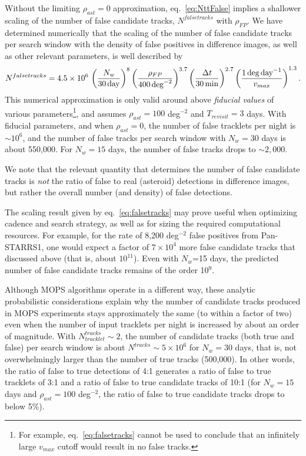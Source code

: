 Without the limiting $\rho_{ast}=0$  approximation, eq.~\ref{eq:NttFalse} implies a shallower scaling
of the number of false candidate tracks, $N^{falsetracks}$ with $\rho_{FP}$.
We have determined numerically that the scaling of the number
of false candidate tracks per search window with the density of false positives in difference
images, as well as other relevant parameters, is well described by
\begin{equation}
\label{eq:falsetracks}
   N^{falsetracks} = 4.5 \times 10^6 \, \left( {N_w \over 30 \, {\rm day} } \right)^{8} \left( {\rho_{FP} \over 400 \, {\rm deg}^{-2} }\right)^{3.7}
    \left( {\Delta t  \over 30 \, {\rm min}} \right)^{2.7}
     \left( { 1 \, {\rm deg} \, {\rm day}^{-1} \over v_{max} }  \right)^{1.3}.
\end{equation}
This numerical approximation is only valid around above {\it fiducial values} of various 
parameters\footnote{For example, eq.~\ref{eq:falsetracks} cannot be used to conclude that
an infinitely large $v_{max}$ cutoff would result in no false tracks.}, 
and assumes $\rho_{ast}=100$ deg$^{-2}$ and $T_{revisit}=3$ days. With fiducial parameters, and 
when $\rho_{ast}=0$, the number of false tracklets per night is $\sim10^6$, and the number of false 
tracks per search window with $N_w=30$ days is about 550,000. For $N_w=15$ days,  the number 
of false tracks drops to $\sim2,000$. 

We note that the relevant quantity that determines the number of false candidate tracks is {\it not}
the ratio of false to real (asteroid) detections in difference images, but rather the overall number 
(and density) of false detections.

The scaling result given by eq.~\ref{eq:falsetracks} may prove useful when optimizing cadence
and search strategy, as well as for sizing the required computational resources. For example,
for the rate of 8,200 deg$^{-2}$ false positives from Pan-STARRS1, one would expect a factor
of $7\times10^4$ more false candidate tracks that discussed above (that is, about $10^{11}$).
Even with $N_w$=15 days, the predicted number of false candidate tracks remains of the
order 10$^9$.

Although MOPS algorithms operate in a different way, these analytic probabilistic considerations
explain why the number of candidate tracks produced in MOPS experiments stays approximately
the same (to within a factor of two) even when the number of input tracklets per night is increased
by about an order of magnitude. With $N_{tracklet}^{tracks} \sim2$, the number of  candidate
tracks (both true and false) per search window is about $N^{tracks} \sim 5\times10^6$ for $N_w= 30$ days,
that is, not overwhelmingly larger than the number of true tracks (500,000). In other words, the ratio of
false to true detections of 4:1 generates a ratio of false to true tracklets of 3:1 and a ratio of false to true
candidate tracks of 10:1 (for $N_w=15$ days and $\rho_{ast}=100$ deg$^{-2}$, the ratio of false to true
candidate tracks drops to below 5\%).

